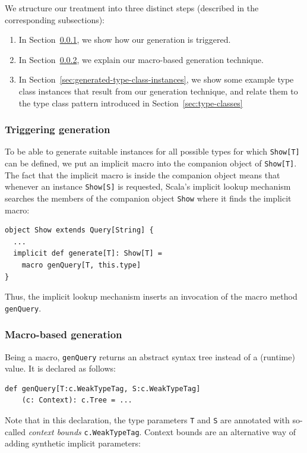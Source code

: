 \documentclass[preprint,nocopyrightspace]{sigplanconf}
\begin{document}
We structure our treatment into three distinct steps (described in the
corresponding subsections):

\begin{enumerate}
\item In Section~\ref{sec:triggering-generation}, we show how our generation is
      triggered.

\item In Section~\ref{sec:macro-based-generation}, we explain our macro-based
      generation technique.

\item In Section~\ref{sec:generated-type-class-instances}, we show some example
      type class instances that result from our generation technique, and relate
      them to the type class pattern introduced in Section~\ref{sec:type-classes}
\end{enumerate}

\subsubsection{Triggering generation}
\label{sec:triggering-generation}

To be able to generate suitable instances for all possible types for which
\verb|Show[T]| can be defined, we put an implicit macro into the companion
object of \verb|Show[T]|. The fact that the implicit macro is inside the
companion object means that whenever an instance \verb|Show[S]| is requested,
Scala's implicit lookup mechanism searches the members of the companion object
\verb|Show| where it finds the implicit macro:

\begin{lstlisting}
object Show extends Query[String] {
  ...
  implicit def generate[T]: Show[T] =
    macro genQuery[T, this.type]
}
\end{lstlisting}
\noindent
Thus, the implicit lookup mechanism inserts an invocation of the macro method
\verb|genQuery|.

\subsubsection{Macro-based generation}
\label{sec:macro-based-generation}

Being a macro, \verb|genQuery| returns an abstract syntax
tree instead of a (runtime) value. It is declared as follows:

\begin{lstlisting}
def genQuery[T:c.WeakTypeTag, S:c.WeakTypeTag]
    (c: Context): c.Tree = ...
\end{lstlisting}
\noindent
Note that in this declaration, the type parameters \verb|T| and \verb|S| are annotated with
so-called \emph{context bounds} \verb|c.WeakTypeTag|. Context bounds are an
alternative way of adding synthetic implicit parameters:
\end{document}
